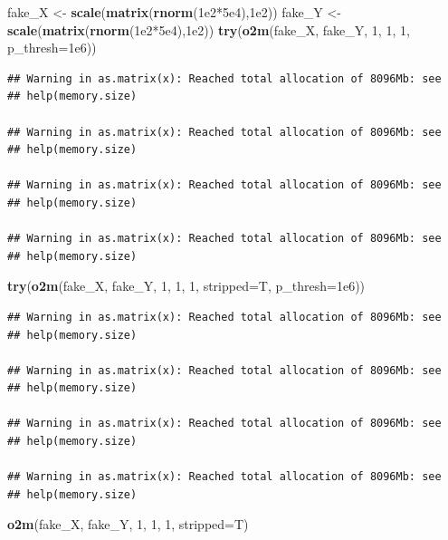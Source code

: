 \documentclass[]{article}
\newenvironment{Shaded}{\begin{snugshade}}{\end{snugshade}}
\newcommand{\KeywordTok}[1]{\textcolor[rgb]{0.13,0.29,0.53}{\textbf{{#1}}}}
\newcommand{\DataTypeTok}[1]{\textcolor[rgb]{0.13,0.29,0.53}{{#1}}}
\newcommand{\DecValTok}[1]{\textcolor[rgb]{0.00,0.00,0.81}{{#1}}}
\newcommand{\FloatTok}[1]{\textcolor[rgb]{0.00,0.00,0.81}{{#1}}}
\newcommand{\StringTok}[1]{\textcolor[rgb]{0.31,0.60,0.02}{{#1}}}
\newcommand{\NormalTok}[1]{{#1}}
\begin{document}
\begin{Shaded}
\begin{Highlighting}[]
\NormalTok{fake_X <-}\StringTok{ }\KeywordTok{scale}\NormalTok{(}\KeywordTok{matrix}\NormalTok{(}\KeywordTok{rnorm}\NormalTok{(}\FloatTok{1e2}\NormalTok{*}\FloatTok{5e4}\NormalTok{),}\FloatTok{1e2}\NormalTok{))}
\NormalTok{fake_Y <-}\StringTok{ }\KeywordTok{scale}\NormalTok{(}\KeywordTok{matrix}\NormalTok{(}\KeywordTok{rnorm}\NormalTok{(}\FloatTok{1e2}\NormalTok{*}\FloatTok{5e4}\NormalTok{),}\FloatTok{1e2}\NormalTok{))}
\KeywordTok{try}\NormalTok{(}\KeywordTok{o2m}\NormalTok{(fake_X, fake_Y, }\DecValTok{1}\NormalTok{, }\DecValTok{1}\NormalTok{, }\DecValTok{1}\NormalTok{, }\DataTypeTok{p_thresh=}\FloatTok{1e6}\NormalTok{))}
\end{Highlighting}
\end{Shaded}

\begin{verbatim}
## Warning in as.matrix(x): Reached total allocation of 8096Mb: see
## help(memory.size)

## Warning in as.matrix(x): Reached total allocation of 8096Mb: see
## help(memory.size)

## Warning in as.matrix(x): Reached total allocation of 8096Mb: see
## help(memory.size)

## Warning in as.matrix(x): Reached total allocation of 8096Mb: see
## help(memory.size)
\end{verbatim}

\begin{Shaded}
\begin{Highlighting}[]
\KeywordTok{try}\NormalTok{(}\KeywordTok{o2m}\NormalTok{(fake_X, fake_Y, }\DecValTok{1}\NormalTok{, }\DecValTok{1}\NormalTok{, }\DecValTok{1}\NormalTok{, }\DataTypeTok{stripped=}\NormalTok{T, }\DataTypeTok{p_thresh=}\FloatTok{1e6}\NormalTok{))}
\end{Highlighting}
\end{Shaded}

\begin{verbatim}
## Warning in as.matrix(x): Reached total allocation of 8096Mb: see
## help(memory.size)

## Warning in as.matrix(x): Reached total allocation of 8096Mb: see
## help(memory.size)

## Warning in as.matrix(x): Reached total allocation of 8096Mb: see
## help(memory.size)

## Warning in as.matrix(x): Reached total allocation of 8096Mb: see
## help(memory.size)
\end{verbatim}

\begin{Shaded}
\begin{Highlighting}[]
\KeywordTok{o2m}\NormalTok{(fake_X, fake_Y, }\DecValTok{1}\NormalTok{, }\DecValTok{1}\NormalTok{, }\DecValTok{1}\NormalTok{, }\DataTypeTok{stripped=}\NormalTok{T)}
\end{Highlighting}
\end{Shaded}
\end{document}

